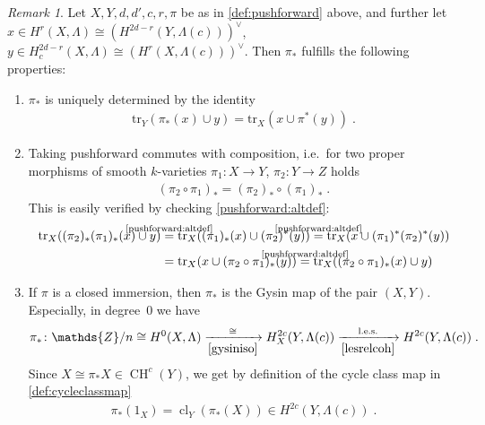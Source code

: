 \documentclass[english,headsepline=0.25pt]{scrartcl}
\theoremstyle{definition}
\theoremstyle{remark}
\newtheorem{Rem}[Def]{Remark}
\newcommand*{\Z}{\mathds{Z}}
\newcommand*{\Zmod}[1]{\Z/#1} %
\newcommand*{\idest}{i.e.\ }
\newcommand*{\Tr}{\text{tr}} %
\DeclareMathOperator{\CH}{CH} %
\DeclareMathOperator{\CL}{cl} %
\newcommand*{\cl}[2]{{\CL_{#1}\left(#2\right)}} %
\newcommand*{\one}[1]{{1_{#1}}}%
\begin{document}
\begin{Rem}\label{proppushforward}
  Let $X,Y,d,d',c,r,\pi$ be as in \ref{def:pushforward} above,
  and further let
  $x\in H^r(X,\Lambda)\cong \left(H^{2d-r}(Y,\Lambda(c))\right)^\vee$,
  $y\in H_c^{2d-r}(X,\Lambda)\cong
  \left(H^{r}(X,\Lambda(c))\right)^\vee$.
  Then $\pi_*$ fulfills the following properties:
  \begin{enumerate}[label=(P\arabic*)]
  \item\label{pushforward:altdef}
    $\pi_*$ is uniquely determined by the identity
    \begin{gather*}
      \Tr_{Y}\left(\pi_*(x)\cup y\right) =
      \Tr_{X}\left(x\cup\pi^*(y)\right)
      \;.
    \end{gather*}
  \item\label{pushforward:composition}
    Taking pushforward commutes with composition, \idest for two
    proper morphisms of smooth $k$-varieties
    $\pi_1\colon X\to Y$, $\pi_2\colon Y\to Z$ holds
    \begin{gather*}
      (\pi_2\circ \pi_1)_* = (\pi_2)_*\circ(\pi_1)_*\;.
    \end{gather*}
    This is easily verified by checking \ref{pushforward:altdef}:
    \begin{align*}
      \Tr_X((\pi_2)_*(\pi_1)_*(x) \cup y)
      &\overset{\mathclap{\text{\ref{pushforward:altdef}}}}=
        \Tr_X((\pi_1)_*(x) \cup (\pi_2)^*(y))
      \overset{\mathclap{\text{\ref{pushforward:altdef}}}}=
        \Tr_X(x \cup (\pi_1)^*(\pi_2)^*(y))\\
      &=\Tr_X(x \cup (\pi_2\circ\pi_1)_*(y))
      \overset{\mathclap{\text{\ref{pushforward:altdef}}}}=
        \Tr_X((\pi_2\circ\pi_1)_*(x)\cup y)
    \end{align*}
  \item\label{P3}
    If $\pi$ is a closed immersion, then $\pi_*$ is the Gysin map of
    the pair $(X,Y)$. Especially, in degree~0 we have
    \begin{align*}
      \pi_*\colon
      \Zmod{n}\cong H^{0}(X,\Lambda)
      \xrightarrow[\ref{gysiniso}]{\cong}
      H_X^{2c}(Y,\Lambda(c))
      \xrightarrow[\ref{lesrelcoh}]{\text{l.e.s.}}
      H^{2c}(Y,\Lambda(c))
      \;.
    \end{align*}
    Since $X\cong\pi_*X\in\CH^{c}(Y)$, we get by definition of
    the cycle class map in \ref{def:cycleclassmap}
    \begin{gather*}
      \pi_*(\one{X})=\cl{Y}{\pi_*(X)}\in H^{2c}(Y,\Lambda(c))\;.
    \end{gather*}

\end{enumerate}
\end{Rem}
\end{document}

